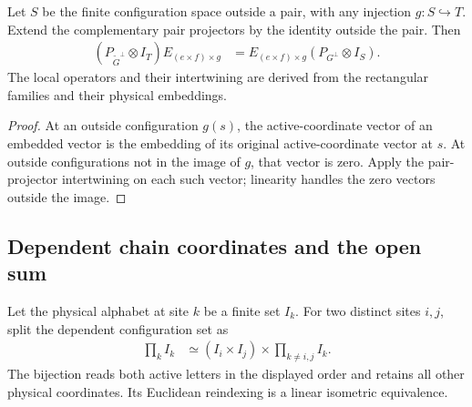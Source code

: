 \begin{lemma}
    \label{lem:varying_physical_local_parent_transport}
    \leanok
    Let $S$ be the finite configuration space outside a pair, with any
    injection $g:S\hookrightarrow T$. Extend the complementary pair
    projectors by the identity outside the pair. Then
    \begin{align}
        (P_{\widetilde G^\perp}\otimes I_T)E_{(e\times f)\times g}
         & =E_{(e\times f)\times g}(P_{G^\perp}\otimes I_S).
    \end{align}
    The local operators and their intertwining are derived from the
    rectangular families and their physical embeddings.
\end{lemma}
\begin{proof}\leanok
    At an outside configuration $g(s)$, the active-coordinate vector of an
    embedded vector is the embedding of its original active-coordinate vector
    at $s$. At outside configurations not in the image of $g$, that vector is
    zero. Apply the pair-projector intertwining on each such vector; linearity
    handles the zero vectors outside the image.
\end{proof}

\subsection{Dependent chain coordinates and the open sum}

\begin{definition}
    \label{def:dependent_physical_pair_coordinates}
    \leanok
    Let the physical alphabet at site $k$ be a finite set $I_k$. For two
    distinct sites $i,j$, split the dependent configuration set as
    \begin{align}
        \prod_k I_k & \simeq (I_i\times I_j)\times
        \prod_{k\ne i,j}I_k.
    \end{align}
    The bijection reads both active letters in the displayed order and
    retains all other physical coordinates. Its Euclidean reindexing is
    a linear isometric equivalence.
\end{definition}

